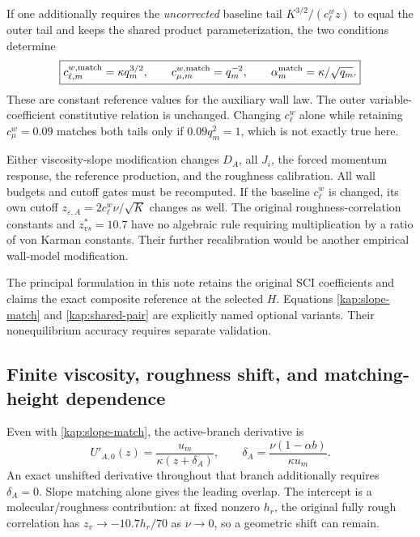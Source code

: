 \documentclass[11pt,a4paper]{article}
\numberwithin{equation}{section}
\newcommand{\eps}{\varepsilon}
\begin{document}
If one additionally requires the \emph{uncorrected} baseline tail
$K^{3/2}/(c_\ell^wz)$ to equal the outer tail and keeps the shared
product parameterization, the two conditions determine
\begin{equation}
 \boxed{
 c_{\ell,m}^{w,\rm match}=\kappa q_m^{3/2},\qquad
 c_{\mu,m}^{w,\rm match}=q_m^{-2},\qquad
 \alpha_m^{\rm match}=\kappa/\sqrt{q_m}.}
 \label{kap:shared-pair}
\end{equation}
These are constant reference values for the auxiliary wall law.
The outer variable-coefficient constitutive relation is unchanged.
Changing $c_\ell^w$ alone while retaining $c_\mu^w=0.09$ matches both
tails only if $0.09q_m^2=1$, which is not exactly true here.

Either viscosity-slope modification changes $D_A$, all $J_i$,
the forced momentum response, the reference production, and the
roughness calibration. All wall budgets and cutoff gates must be
recomputed. If the baseline $c_\ell^w$ is changed, its own cutoff
$z_{\eps,A}=2c_\ell^w\nu/\sqrt K$ changes as well.
The original roughness-correlation constants and $z_{vs}^*=10.7$
have no algebraic rule requiring multiplication by a ratio of
von Karman constants. Their further recalibration would be another
empirical wall-model modification.

The principal formulation in this note retains the original SCI
coefficients and claims the exact composite reference at the selected
$H$. Equations \eqref{kap:slope-match} and \eqref{kap:shared-pair}
are explicitly named optional variants. Their nonequilibrium accuracy
requires separate validation.

\subsection{Finite viscosity, roughness shift, and matching-height dependence}
\label{kap:height}

Even with \cref{kap:slope-match}, the active-branch derivative is
\begin{equation}
 U'_{A,0}(z)=\frac{u_m}{\kappa(z+\delta_A)},\qquad
 \delta_A=\frac{\nu(1-\alpha b)}{\kappa u_m}.
 \label{kap:shifted-gradient}
\end{equation}
An exact unshifted derivative throughout that branch additionally
requires $\delta_A=0$. Slope matching alone gives the leading overlap.
The intercept is a molecular/roughness contribution: at fixed nonzero
$h_r$, the original fully rough correlation has
$z_v\to-10.7h_r/70$ as $\nu\to0$, so a geometric shift can remain.
\end{document}
